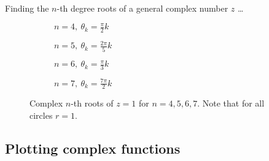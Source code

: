 Finding the $n$-th degree roots of a general complex number $z$ \ldots

\begin{figure}
	\captionsetup[subfigure]{labelformat=empty}
	\centering
	\begin{subfigure}[b]{0.475\textwidth}
		\centering
		\caption{$n=4,\ \theta_{k}=\frac{\pi}{2}k$}
	\end{subfigure}
	\hfill
	\begin{subfigure}[b]{0.475\textwidth}
		\centering
		\caption{$n=5,\ \theta_{k}=\frac{2\pi}{5}k$}
	\end{subfigure}

	\vspace{2em}
	\begin{subfigure}[b]{0.475\textwidth}
		\centering
		\caption{$n=6,\ \theta_{k}=\frac{\pi}{3}k$}
	\end{subfigure}
	\hfill
	\begin{subfigure}[b]{0.475\textwidth}
		\centering
		\caption{$n=7,\ \theta_{k}=\frac{7\pi}{2}k$}
	\end{subfigure}
	\caption{Complex $n$-th roots of $z=1$ for $n=4,5,6,7$. Note that for all circles $r=1$.}
	\label{fig:nth roots of 1}
\end{figure}

\subsection{Plotting complex functions}
\Blindtext
